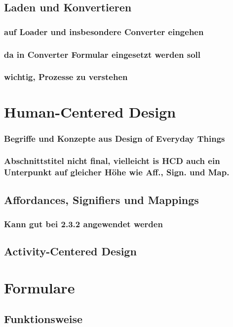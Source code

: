 \documentclass[a4paper, 12pt, oneside, BCOR=1cm,toc=chapterentrywithdots]{scrbook}
\begin{document}
\subsection{Laden und Konvertieren}
\subsubsection{auf Loader und insbesondere Converter eingehen}
\subsubsection{da in Converter Formular eingesetzt werden soll}
\subsubsection{wichtig, Prozesse zu verstehen}



\clearpage
\section{Human-Centered Design}
\subsubsection{Begriffe und Konzepte aus Design of Everyday Things}
\subsubsection{Abschnittstitel nicht final, vielleicht is HCD auch ein Unterpunkt auf gleicher Höhe wie Aff., Sign. und Map.}
\subsection{Affordances, Signifiers und Mappings}
\subsubsection{Kann gut bei 2.3.2 angewendet werden}
\subsection{Activity-Centered Design}

\clearpage
\section{Formulare}
\cite{wroblewskiWebForm2008}
\subsection{Funktionsweise}
\end{document}
